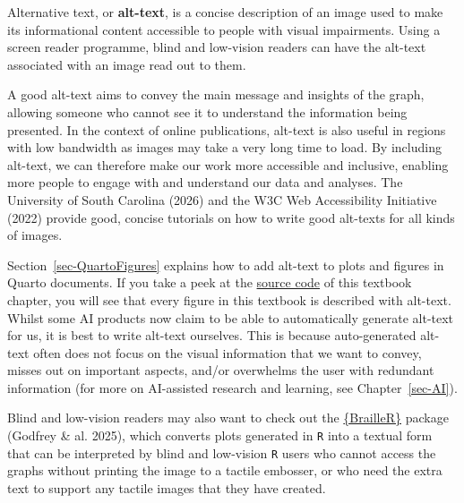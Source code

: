 \documentclass[
  letterpaper,
  DIV=11,
  numbers=noendperiod]{scrreprt}
\begin{document}
\begin{tcolorbox}[enhanced jigsaw, arc=.35mm, bottomrule=.15mm, bottomtitle=1mm, breakable, colback=white, colbacktitle=quarto-callout-note-color!10!white, colframe=quarto-callout-note-color-frame, coltitle=black, left=2mm, leftrule=.75mm, opacityback=0, opacitybacktitle=0.6, rightrule=.15mm, title=\textcolor{quarto-callout-note-color}{\faInfo}\hspace{0.5em}{What is alt-text and why is it important?}, titlerule=0mm, toprule=.15mm, toptitle=1mm]

Alternative text, or \textbf{alt-text}, is a concise description of an
image used to make its informational content accessible to people with
visual impairments. Using a screen reader programme, blind and
low-vision readers can have the alt-text associated with an image read
out to them.

A good alt-text aims to convey the main message and insights of the
graph, allowing someone who cannot see it to understand the information
being presented. In the context of online publications, alt-text is also
useful in regions with low bandwidth as images may take a very long time
to load. By including alt-text, we can therefore make our work more
accessible and inclusive, enabling more people to engage with and
understand our data and analyses. The University of South Carolina
(2026) and the W3C Web Accessibility Initiative (2022) provide good,
concise tutorials on how to write good alt-texts for all kinds of
images.

Section~\ref{sec-QuartoFigures} explains how to add alt-text to plots
and figures in Quarto documents. If you take a peek at the
\href{https://github.com/elenlefoll/RstatsTextbook/blob/main/10_Dataviz.qmd}{source
code} of this textbook chapter, you will see that every figure in this
textbook is described with alt-text. Whilst some AI products now claim
to be able to automatically generate alt-text for us, it is best to
write alt-text ourselves. This is because auto-generated alt-text often
does not focus on the visual information that we want to convey, misses
out on important aspects, and/or overwhelms the user with redundant
information (for more on AI-assisted research and learning, see
Chapter~\ref{sec-AI}).

Blind and low-vision readers may also want to check out the
\href{https://ajrgodfrey.github.io/BrailleR/articles/BrailleR.html}{\{BrailleR\}}
package ({Godfrey \& al.} 2025), which converts plots generated in
\texttt{R} into a textual form that can be interpreted by blind and
low-vision \texttt{R} users who cannot access the graphs without
printing the image to a tactile embosser, or who need the extra text to
support any tactile images that they have created.

\end{tcolorbox}
\end{document}

